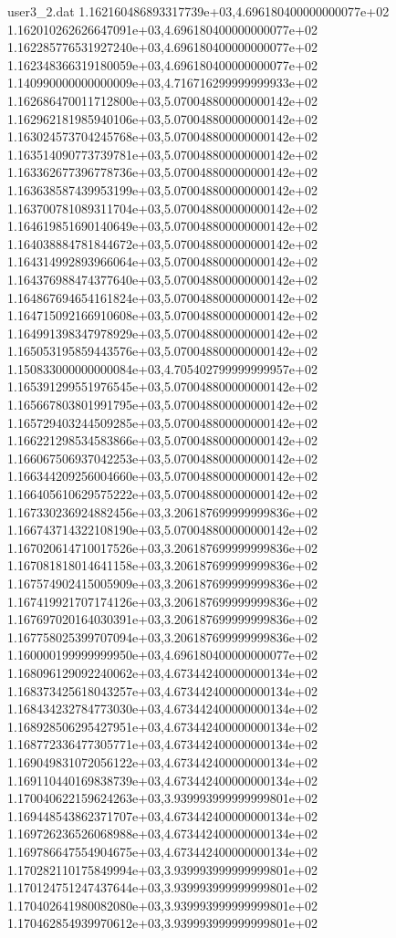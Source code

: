 \begin{filecontents}{user3_2.dat}
1.162160486893317739e+03,4.696180400000000077e+02
1.162010262626647091e+03,4.696180400000000077e+02
1.162285776531927240e+03,4.696180400000000077e+02
1.162348366319180059e+03,4.696180400000000077e+02
1.140990000000000009e+03,4.716716299999999933e+02
1.162686470011712800e+03,5.070048800000000142e+02
1.162962181985940106e+03,5.070048800000000142e+02
1.163024573704245768e+03,5.070048800000000142e+02
1.163514090773739781e+03,5.070048800000000142e+02
1.163362677396778736e+03,5.070048800000000142e+02
1.163638587439953199e+03,5.070048800000000142e+02
1.163700781089311704e+03,5.070048800000000142e+02
1.164619851690140649e+03,5.070048800000000142e+02
1.164038884781844672e+03,5.070048800000000142e+02
1.164314992893966064e+03,5.070048800000000142e+02
1.164376988474377640e+03,5.070048800000000142e+02
1.164867694654161824e+03,5.070048800000000142e+02
1.164715092166910608e+03,5.070048800000000142e+02
1.164991398347978929e+03,5.070048800000000142e+02
1.165053195859443576e+03,5.070048800000000142e+02
1.150833000000000084e+03,4.705402799999999957e+02
1.165391299551976545e+03,5.070048800000000142e+02
1.165667803801991795e+03,5.070048800000000142e+02
1.165729403244509285e+03,5.070048800000000142e+02
1.166221298534583866e+03,5.070048800000000142e+02
1.166067506937042253e+03,5.070048800000000142e+02
1.166344209256004660e+03,5.070048800000000142e+02
1.166405610629575222e+03,5.070048800000000142e+02
1.167330236924882456e+03,3.206187699999999836e+02
1.166743714322108190e+03,5.070048800000000142e+02
1.167020614710017526e+03,3.206187699999999836e+02
1.167081818014641158e+03,3.206187699999999836e+02
1.167574902415005909e+03,3.206187699999999836e+02
1.167419921707174126e+03,3.206187699999999836e+02
1.167697020164030391e+03,3.206187699999999836e+02
1.167758025399707094e+03,3.206187699999999836e+02
1.160000199999999950e+03,4.696180400000000077e+02
1.168096129092240062e+03,4.673442400000000134e+02
1.168373425618043257e+03,4.673442400000000134e+02
1.168434232784773030e+03,4.673442400000000134e+02
1.168928506295427951e+03,4.673442400000000134e+02
1.168772336477305771e+03,4.673442400000000134e+02
1.169049831072056122e+03,4.673442400000000134e+02
1.169110440169838739e+03,4.673442400000000134e+02
1.170040622159624263e+03,3.939993999999999801e+02
1.169448543862371707e+03,4.673442400000000134e+02
1.169726236526068988e+03,4.673442400000000134e+02
1.169786647554904675e+03,4.673442400000000134e+02
1.170282110175849994e+03,3.939993999999999801e+02
1.170124751247437644e+03,3.939993999999999801e+02
1.170402641980082080e+03,3.939993999999999801e+02
1.170462854939970612e+03,3.939993999999999801e+02

\end{filecontents}
